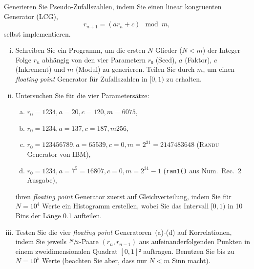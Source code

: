 
\NewDocumentCommand{}
\date{Ausgabe: Di, 16.04.2019, Besprechung: Fr, 26.04.2019}
\setcounter{question}{3}


\maketitle

\begin{question}[subtitle=Linear kongruente Generatoren]
  Generieren Sie Pseudo-Zufallszahlen, indem Sie einen linear kongruenten Generator (LCG),
  \begin{equation}
    \label{eq:1}
    r_{n + 1} = \left( a r_n + c \right) \mod m,
  \end{equation}
  selbst implementieren.

  \begin{enumerate}[(i)]
  \item Schreiben Sie ein Programm, um die ersten $N$ Glieder ($N < m$) der Integer-Folge $r_n$ abhängig von den vier Parametern $r₀$ (Seed), $a$ (Faktor), $c$ (Inkrement) und $m$ (Modul) zu generieren.
    Teilen Sie durch $m$, um einen \textit{floating point} Generator für Zufallszahlen in $[0, 1)$ zu erhalten.
  \item Untersuchen Sie für die vier Parametersätze:
    \begin{enumerate}[(a)]
    \item\label{item:1} $r_0 = 1234, a = 20, c = 120, m = 6075$,
    \item\label{item:2} $r_0 = 1234, a = 137, c = 187, m 256$,
    \item\label{item:3} $r_0 = 123456789, a = 65539, c = 0, m = 2^{31} = 2147483648$ (\textsc{Randu} Generator von IBM),
    \item\label{item:4} $r_0 = 1234, a = 7^5 = 16807, c = 0, m = 2^{31} - 1$ (\texttt{ran1()} aus Num.\ Rec.\ 2 Ausgabe),
    \end{enumerate}
    ihren \textit{floating point} Generator zuerst auf Gleichverteilung, indem Sie für $N = 10^4$ Werte ein Histogramm erstellen, wobei Sie das Intervall $[0, 1)$ in \num{10} Bins der Länge \num{0.1} aufteilen.
  \item Testen Sie die vier \textit{floating point} Generatoren~(a)-(d) auf Korrelationen, indem Sie jeweils $\sfrac{N}{2}$-Paare $(r_n, r_{n - 1})$ aus aufeinanderfolgenden Punkten in einem zweidimensionalen Quadrat $[0, 1]²$ auftragen.
    Benutzen Sie bis zu $N = 10^5$ Werte (beachten Sie aber, dass nur $N < m$ Sinn macht).
  \end{enumerate}
\end{question}

